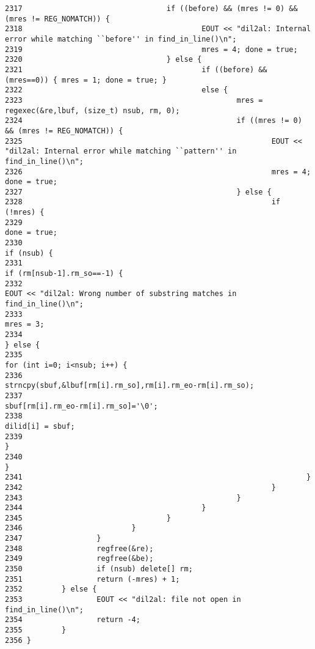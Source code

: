 \begin{verbatim}
2317                                 if ((before) && (mres != 0) && (mres != REG_NOMATCH)) {
2318                                         EOUT << "dil2al: Internal error while matching ``before'' in find_in_line()\n";
2319                                         mres = 4; done = true;
2320                                 } else {
2321                                         if ((before) && (mres==0)) { mres = 1; done = true; }
2322                                         else {
2323                                                 mres = regexec(&re,lbuf, (size_t) nsub, rm, 0);
2324                                                 if ((mres != 0) && (mres != REG_NOMATCH)) {
2325                                                         EOUT << "dil2al: Internal error while matching ``pattern'' in find_in_line()\n";
2326                                                         mres = 4; done = true;
2327                                                 } else {
2328                                                         if (!mres) {
2329                                                                 done = true;
2330                                                                 if (nsub) {
2331                                                                         if (rm[nsub-1].rm_so==-1) {
2332                                                                                 EOUT << "dil2al: Wrong number of substring matches in find_in_line()\n";
2333                                                                                 mres = 3;
2334                                                                         } else {
2335                                                                                 for (int i=0; i<nsub; i++) {
2336                                                                                         strncpy(sbuf,&lbuf[rm[i].rm_so],rm[i].rm_eo-rm[i].rm_so);
2337                                                                                         sbuf[rm[i].rm_eo-rm[i].rm_so]='\0';
2338                                                                                         dilid[i] = sbuf;
2339                                                                                 }
2340                                                                         }
2341                                                                 }
2342                                                         }
2343                                                 }
2344                                         }
2345                                 }
2346                         }
2347                 }
2348                 regfree(&re);
2349                 regfree(&be);
2350                 if (nsub) delete[] rm;
2351                 return (-mres) + 1;
2352         } else {
2353                 EOUT << "dil2al: file not open in find_in_line()\n";
2354                 return -4;
2355         }
2356 }
\end{verbatim}\normalsize 
{}

